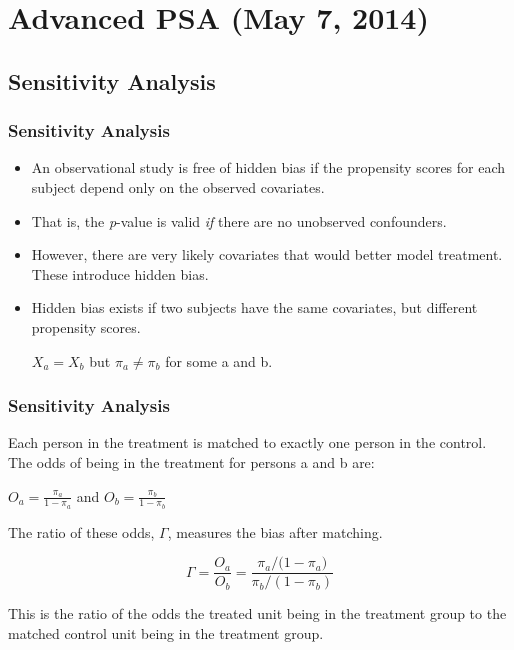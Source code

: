 \documentclass[10pt,slidestop,mathserif,c]{beamer}
\begin{document}
\section{Advanced PSA (May 7, 2014)}


\subsection{Sensitivity Analysis}

\begin{frame}
    \frametitle{Sensitivity Analysis}
    \begin{itemize}
        \item An observational study is free of hidden bias if the propensity scores for each subject depend only on the observed covariates.
        \item That is, the \textit{p}-value is valid \textit{if} there are no unobserved confounders.
        \item However, there are very likely covariates that would better model treatment. These introduce hidden bias.
        \item Hidden bias exists if two subjects have the same covariates, but different propensity scores.
        \begin{center}
        $X_a = X_b$ but ${ \pi  }_{ a }\neq { \pi  }_{ b }$ for some a and b.
        \end{center}
    \end{itemize}

\end{frame}

\begin{frame}
    \frametitle{Sensitivity Analysis}
    Each person in the treatment is matched to exactly one person in the control. The odds of being in the treatment for persons a and b are:
    
    \begin{center}
    $O_a = \frac{  \pi_a }{ 1 - \pi_a }$ and $O_b = \frac{  \pi_b }{ 1 - \pi_b }$
    \end{center}
    
    The ratio of these odds, $\Gamma$, measures the bias after matching.
    
     $$\Gamma =\frac { { O }_{ a } }{ { O }_{ b } } =\frac { { { \pi  }_{ a } / ( }{ 1-{ \pi  }_{ a }) } }{ { { \pi  }_{ b } / (1-{ \pi  }_{ b }) } } $$
   
   This is the ratio of the odds the treated unit being in the treatment group to the matched control unit being in the treatment group.
\end{frame}
\end{document}
